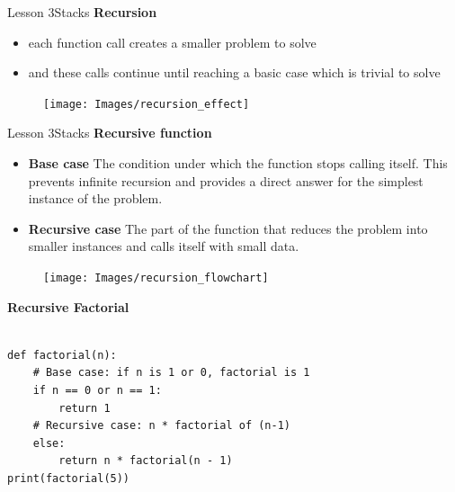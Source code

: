 \documentclass[aspectratio=1610]{beamer}
\begin{document}
\begin{frame}{Lesson 3}{Stacks}
\LARGE
\textbf{Recursion}\\
\begin{minipage}{0.53\textwidth}
\begin{itemize}
    \item each function call creates a smaller problem to solve
    \item and these calls continue until reaching a basic case which is trivial to solve
\end{itemize}
  \end{minipage}
\begin{minipage}{.0\textwidth}
      \begin{figure}
        \texttt{[image: Images/recursion\_effect]}
      \end{figure}
  \end{minipage}  
\end{frame}



\begin{frame}{Lesson 3}{Stacks}
\LARGE
\textbf{Recursive function}\\
\begin{minipage}{0.60\textwidth}
\Large
\begin{itemize}
    \item \textbf{Base case} The condition under which the function stops calling itself. This prevents infinite recursion and provides a direct answer for the simplest instance of the problem.
    \item \textbf{Recursive case} The part of the function that reduces the problem into smaller instances and calls itself with small data.
\end{itemize}
  \end{minipage}
\begin{minipage}{.0\textwidth}
      \begin{figure}
        \texttt{[image: Images/recursion\_flowchart]}
      \end{figure}
  \end{minipage}  
\end{frame}



\begin{frame}[fragile]
\Large
\textbf{Recursive Factorial}\\~\\
\begin{lstlisting}
def factorial(n):
    # Base case: if n is 1 or 0, factorial is 1
    if n == 0 or n == 1:
        return 1
    # Recursive case: n * factorial of (n-1)
    else:
        return n * factorial(n - 1)
print(factorial(5))
 \end{lstlisting}
\end{frame}
\end{document}
